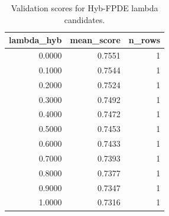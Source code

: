 \begin{table}[t]
\caption{Validation scores for Hyb-FPDE lambda candidates.}
\label{tab:lambda_distribution_computed}
\centering
\begin{tabular}{rrr}
\toprule
lambda\_hyb & mean\_score & n\_rows \\
\midrule
0.0000 & 0.7551 & 1 \\
0.1000 & 0.7544 & 1 \\
0.2000 & 0.7524 & 1 \\
0.3000 & 0.7492 & 1 \\
0.4000 & 0.7472 & 1 \\
0.5000 & 0.7453 & 1 \\
0.6000 & 0.7433 & 1 \\
0.7000 & 0.7393 & 1 \\
0.8000 & 0.7377 & 1 \\
0.9000 & 0.7347 & 1 \\
1.0000 & 0.7316 & 1 \\
\bottomrule
\end{tabular}

\end{table}
